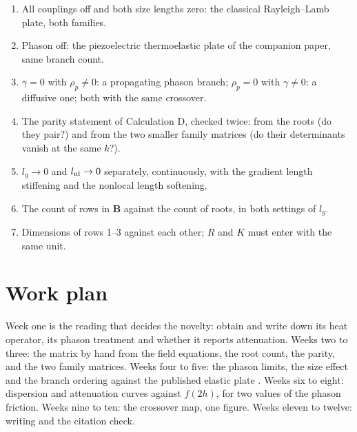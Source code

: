 \documentclass[11pt]{article}
\begin{document}
\begin{enumerate}
\item All couplings off and both size lengths zero: the classical Rayleigh--Lamb plate, both families.
\item Phason off: the piezoelectric thermoelastic plate of the companion paper, same branch count.
\item $\gamma=0$ with $\rho_p\ne0$: a propagating phason branch; $\rho_p=0$ with $\gamma\ne0$: a diffusive
one; both with the same crossover.
\item The parity statement of Calculation D, checked twice: from the roots (do they pair?) and from the two
smaller family matrices (do their determinants vanish at the same $k$?).
\item $l_g\to0$ and $l_{\rm nl}\to0$ separately, continuously, with the gradient length stiffening and the
nonlocal length softening.
\item The count of rows in $\mathbf B$ against the count of roots, in both settings of $l_g$.
\item Dimensions of rows 1--3 against each other; $R$ and $K$ must enter with the same unit.
\end{enumerate}

\section{Work plan}\label{sec:plan}

Week one is the reading that decides the novelty: obtain \cite{Zhang2026} and write down its heat operator,
its phason treatment and whether it reports attenuation. Weeks two to three: the matrix by hand from the
field equations, the root count, the parity, and the two family matrices. Weeks four to five: the phason
limits, the size effect and the branch ordering against the published elastic plate \cite{Zhang2021}.
Weeks six to eight: dispersion and attenuation curves against $f(2h)$, for two values of the phason
friction. Weeks nine to ten: the crossover map, one figure. Weeks eleven to twelve: writing and the
citation check.



\end{document}
